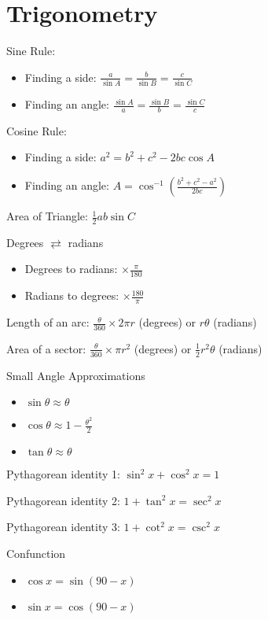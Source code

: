 \documentclass[10pt,a4paper,oneside]{book}
\begin{document}
\section*{Trigonometry}
Sine Rule: 
\begin{itemize}
    \item Finding a side: $\frac{a}{\sin A}=\frac{b}{\sin B}=\frac{c}{\sin C}$
    \item Finding an angle: $\frac{\sin A}{a}=\frac{\sin B}{b}=\frac{\sin C}{c}$
\end{itemize}

Cosine Rule:
\begin{itemize}
    \item Finding a side: $a^2=b^2+c^2-2bc\cos A$
    \item Finding an angle: $A=\cos^{-1}\left(\frac{b^2+c^2-a^2}{2bc}\right)$
\end{itemize}

Area of Triangle: $\frac{1}{2}ab\sin C$

Degrees $\rightleftarrows$ radians
\begin{itemize}
    \item Degrees to radians: $\times \frac{\pi}{180}$
    \item Radians to degrees: $\times \frac{180}{\pi}$
\end{itemize}

Length of an arc: $\frac{\theta}{360}\times 2\pi r$ (degrees) or $r\theta$ (radians)

Area of a sector: $\frac{\theta}{360}\times \pi r^2$ (degrees) or $\frac{1}{2}r^2\theta$ (radians)

Small Angle Approximations
\begin{itemize}
    \item $\sin\theta \approx \theta$
    \item $\cos\theta \approx 1-\frac{\theta^2}{2}$
    \item $\tan\theta \approx \theta$
\end{itemize}

Pythagorean identity 1: $\sin^2 x + \cos^2 x = 1$

Pythagorean identity 2: $1+\tan^2 x = \sec^2 x$

Pythagorean identity 3: $1+\cot^2 x = \csc^2 x$

Confunction
\begin{itemize}
    \item $\cos x = \sin(90-x)$
    \item $\sin x = \cos(90-x)$
\end{itemize}
\end{document}
